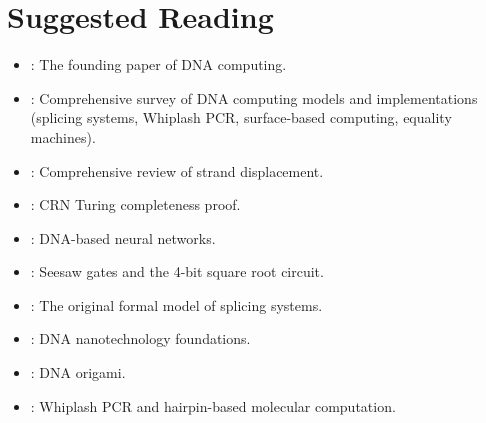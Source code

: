 \section*{Suggested Reading}
\begin{itemize}[leftmargin=1.5em]
  \item \citet{adleman1994}: The founding paper of DNA computing.
  \item \citet{daleykari2002}: Comprehensive survey of DNA computing models and implementations (splicing systems, Whiplash PCR, surface-based computing, equality machines).
  \item \citet{zhang2011}: Comprehensive review of strand displacement.
  \item \citet{soloveichik2010}: CRN Turing completeness proof.
  \item \citet{cherry2018}: DNA-based neural networks.
  \item \citet{qian2011seesaw}: Seesaw gates and the 4-bit square root circuit.
  \item \citet{head1987}: The original formal model of splicing systems.
  \item \citet{seeman2003}: DNA nanotechnology foundations.
  \item \citet{rothemund2006}: DNA origami.
  \item \citet{sakamoto2000}: Whiplash PCR and hairpin-based molecular computation.
\end{itemize}
